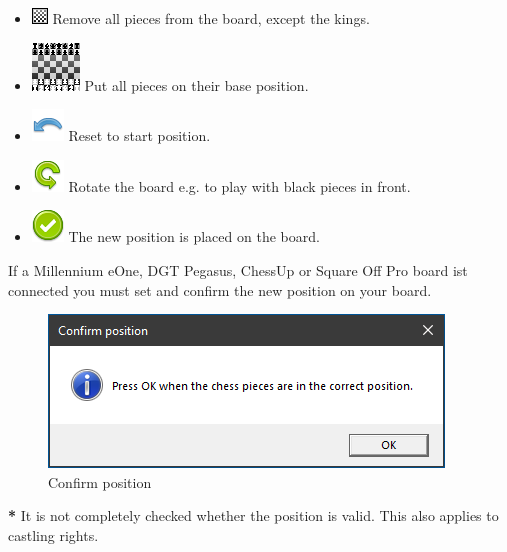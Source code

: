 \documentclass[11pt,a4paper]{article}
\begin{document}
\begin{itemize}
	\item \includegraphics[scale=1]{Board64black.png} Remove all pieces from the board, except the kings.
	\item \includegraphics[scale=0.3]{Array.png} Put all pieces on their base position.
	\item \includegraphics[scale=0.5]{Undo.png} Reset to start position.
	\item \includegraphics[scale=0.5]{arrow_rotate_anticlockwise.png} Rotate the board e.g. to play with black pieces in front.
	\item \includegraphics[scale=0.5]{accept_button.png} The new position is placed on the board.
\end{itemize}


If a Millennium eOne, DGT Pegasus, ChessUp or Square Off Pro board ist connected you must set and confirm the new position on your board.
\begin{figure}[H]
	\centering
	\includegraphics[scale=1.0]{ConfirmPosition.png}
	\caption{Confirm position}
	\label{fig:ConfirmPosition}
\end{figure}

\textbf{{\color{red}*}} It is not completely checked whether the position is valid. This also applies to castling rights.
\end{document}
